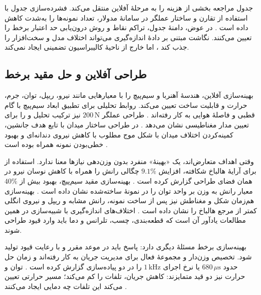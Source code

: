 جدول مراجعه بخشی از هزینه را به مرحلهٔ آفلاین منتقل می‌کند. فشرده‌سازی جدول با استفاده از تقارن و ساختار عملگر در سامانهٔ مدولار، تعداد نمونه‌ها را به‌شدت کاهش داده است \cite{jeroendeboeijLookUpTableBased2007,xuModularMaglevDesign2024d}. در عوض، دامنهٔ جدول، تراکم نقاط و روش درون‌یابی حد اعتبار برخط را تعیین می‌کنند. نگاشت مبتنی بر دادهٔ اندازه‌گیری می‌تواند اختلاف مدل و سخت‌افزار را جذب کند \cite{nakataCompensationFEMBased2026}، اما خارج از ناحیهٔ کالیبراسیون تضمینی ایجاد نمی‌کند.

\subsection{طراحی آفلاین و حل مقید برخط}
\label{subsec:geometry-topology-optimization}
\label{subsec:online-constrained-optimization}
\label{subsec:thermal-uncertainty-optimization}

بهینه‌سازی آفلاین، هندسهٔ آهنربا و سیم‌پیچ را با معیارهایی مانند نیرو، ریپل، توان، جرم، حرارت و قابلیت ساخت تعیین می‌کند. روابط تحلیلی برای تطبیق ابعاد سیم‌پیچ با گام قطبی و فاصلهٔ هوایی به کار رفته‌اند \cite{zhangOptimalMatchingDesign2019}. طراحی عملگر \(200\,\mathrm{N}\) نیز ترکیب تحلیل و  را برای تعیین مدار مغناطیسی نشان می‌دهد \cite{yangDesign200NMagnetic2024}. در طراحی ساختار میدان با تابع هدف جانشین، کمینه‌کردن اختلاف میدان با شکل موج مطلوب با کاهش نیروی دندانه‌ای و بهبود خطی‌بودن نمونه همراه بوده است \cite{yuMethodStructuralDesign2026d}.

وقتی اهداف متعارض‌اند، یک «بهینهٔ» منفرد بدون وزن‌دهی نیازها معنا ندارد. استفاده از  برای آرایهٔ هالباخ شکافته، افزایش \(9.1\%\) چگالی رانش را همراه با کاهش نوسان نیرو در همان فضای طراحی گزارش کرده است \cite{wangAnalysisOptimizationMoving2025}. بهینه‌سازی مقید سیم‌پیچ، بهبود بیش از \(40\%\) معیار رانش به وزن بر واحد توان را در نمونهٔ ساخته‌شده نشان داده است \cite{zengSpatialConstrainedStructureOptimization2026h}. بهینه‌سازی هم‌زمان شکل و مغناطش نیز پس از ساخت نمونه، رانش مشابه و ریپل و نیروی انگلی کمتر از مرجع هالباخ را نشان داده است \cite{jiangSimultaneousMagnetizationShape2026}. اختلاف‌های اندازه‌گیری با شبیه‌سازی در همین مطالعات یادآور آن است که قطعه‌بندی، چسب، تلرانس و دما باید وارد قیود طراحی شوند.

بهینه‌سازی برخط مسئلهٔ دیگری دارد: پاسخ باید در موعد مقرر و با رعایت قیود تولید شود. تخصیص وزن‌دار و مجموعهٔ فعال برای مدیریت جریان به کار رفته‌اند \cite{wangMagnetcoilRoleswitchingRealtime2024,liuOptimizedRealTimeCurrent2026} و  زمان حل حدود \(680\,\mu\mathrm{s}\) یا نرخ اجرای \(1\,\mathrm{kHz}\) را در دو پیاده‌سازی گزارش کرده است \cite{xuPredictorbasedModelPredictive2023,zhouTrackingErrorSuppression2025}. توان و حرارت نیز دو قید متمایزند: کاهش جریان، تلفات را کم می‌کند؛ مسیر حرارتی تعیین می‌کند این تلفات چه دمایی ایجاد می‌کنند \cite{muDesignOptimizationLargeairgap2025}.


